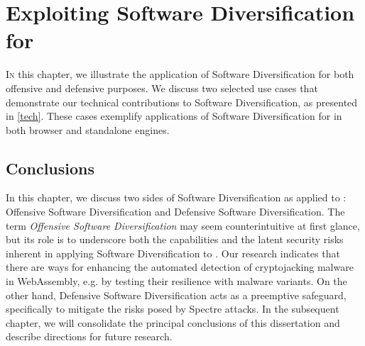 \chapter{Exploiting Software Diversification for \Wasm}
\label{exploit}
\lettrine[lines=4]{I}{n} this chapter, we illustrate the application of Software Diversification for both offensive and defensive purposes.
We discuss two selected use cases that demonstrate our technical contributions to Software Diversification, as presented in \autoref{tech}.
These cases exemplify applications of Software Diversification for \Wasm in both browser and standalone engines.








% 

\section*{Conclusions}

In this chapter, we discuss two sides of Software Diversification as applied to \Wasm: Offensive Software Diversification and Defensive Software Diversification.
The term \emph{Offensive Software Diversification} may seem counterintuitive at first glance, but its role is to underscore both the capabilities and the latent security risks inherent in applying Software Diversification to \Wasm.
Our research indicates that there are ways for enhancing the automated detection of cryptojacking malware in WebAssembly, e.g. by testing their resilience with \Wasm malware variants.
On the other hand, Defensive Software Diversification acts as a preemptive safeguard, specifically to mitigate the risks posed by Spectre attacks.
In the subsequent chapter, we will consolidate the principal conclusions of this dissertation and describe directions for future research.